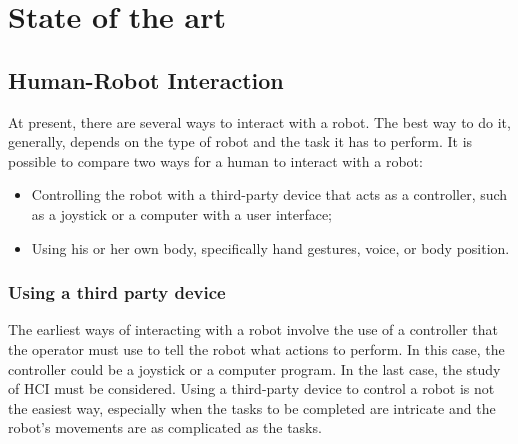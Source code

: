\documentclass[../thesis.tex]{subfiles}
\begin{document}
\chapter{State of the art}\label{cap:theory}

\section{Human-Robot Interaction}
At present, there are several ways to interact with a robot. The best way to do it, generally, depends on the type of robot and the task it has to perform. It is possible to compare two ways for a human to interact with a robot:
\begin{itemize}
    \item Controlling the robot with a third-party device that acts as a controller, such as a joystick or a computer with a user interface;
    \item Using his or her own body, specifically hand gestures, voice, or body position.
\end{itemize}
\subsection{Using a third party device}
The earliest ways of interacting with a robot involve the use of a controller that the operator must use to tell the robot what actions to perform. In this case, the controller could be a joystick or a computer program. In the last case, the study of \acrfull{HCI} must be considered. Using a third-party device to control a robot is not the easiest way, especially when the tasks to be completed are intricate and the robot’s movements are as complicated as the tasks.
\end{document}
